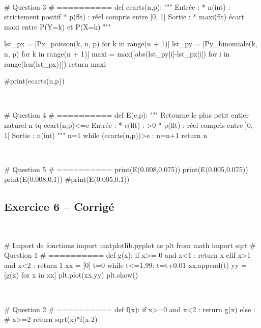 \documentclass[10pt,fleqn]{article} %
\begin{document}
\begin{corrige}
$\quad$
\begin{python}
# Question 3
# ==========
def ecarts(n,p):
	"""
	Entrée :
     * n(int) : strictement positif
     * p(flt) : réel compris entre ]0, 1[
    Sortie : 
     * maxi(flt) écart maxi entre P(Y=k) et P(X=k)
    """
     
	lst_px = [Px_poisson(k, n, p) for k in range(n + 1)]
    lst_py = [Py_binomiale(k, n, p) for k in range(n + 1)]
    maxi = max([abs(lst_py[i]-lst_px[i]) for i in range(len(lst_px))])
    return maxi
    
#print(ecarts(n,p))
\end{python}
\end{corrige}

\begin{corrige}
$\quad$
\begin{python}
# Question 4
# ==========
def E(e,p):
	"""
	Retourne le plus petit entier naturel n tq ecart(n,p)<=e
	Entrée : 
	 * e(flt) : >0
	 * p(flt) : réel compris entre ]0, 1[
    Sortie :
     n(int)
	"""
	n=1
	while (ecarts(n,p))>e :
		n=n+1
	return n
\end{python}
\end{corrige}

\begin{corrige}
$\quad$
\begin{python}
# Question 5
# ==========
print(E(0.008,0.075))
print(E(0.005,0.075))
print(E(0.008,0.1))
#print(E(0.005,0.1))
\end{python}
\end{corrige}




\subsection*{Exercice 6 -- Corrigé}
\begin{corrige}
$\quad$
\begin{python}
# Import de fonctions
import matplotlib.pyplot as plt
from math import sqrt
# Question 1 
# ==========
def g(x):
    if x>= 0 and x<1 :
        return x
    elif x>1 and x<2 :
        return 1
xx = [0]
t=0
while t<=1.99:
    t=t+0.01
    xx.append(t)
yy = [g(x) for x in xx]
plt.plot(xx,yy)
plt.show()
\end{python}
\end{corrige}

\begin{corrige}
$\quad$
\begin{python}
# Question 2
# ==========
def f(x):
    if x>=0 and x<2 :
        return g(x)
    else : # x>=2
        return sqrt(x)*f(x-2)
\end{python}
\end{corrige}
\end{document}
